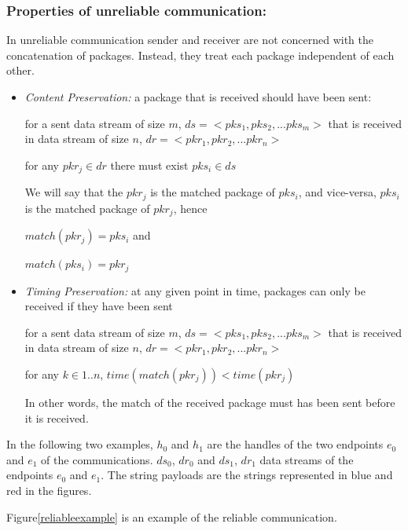 \subsubsection{Properties of unreliable communication:}\label{unreliablepro}
In unreliable communication sender and receiver are not concerned with the concatenation of packages. Instead, they treat each package independent of each other.
\begin{itemize}
 \item \textit{ Content Preservation:} a package that is received should have been sent:

for a sent data stream of size $m$, $ds= <pks_1, pks_2, ... pks_m>$ that is received in data stream of size $n$, $dr = <pkr_1, pkr_2, ... pkr_n>$

for any $pkr_j \in dr$ there must exist $pks_i \in ds$

We will say that the $pkr_j$ is the matched package of $pks_i$, and vice-versa, $pks_i$ is the matched package of $pkr_j$, hence

$match(pkr_j) = pks_i$  and

$match(pks_i) = pkr_j$

 \item \textit{Timing Preservation:}  at any given point in time, packages can only be received if they have been sent

  for a sent data stream of size $m$, $ds= <pks_1, pks_2, ... pks_m>$ that is received in data stream of size $n$, $dr = <pkr_1, pkr_2, ... pkr_n>$

  for any $k \in {1..n}$, $time(match(pkr_j)) < time(pkr_j)$

In other words, the match of the received package must has been sent before it is received.

\end{itemize}



In the following two examples, $h_0$ and $h_1$ are the handles of the two endpoints $e_0$ and $e_1$ of the communications. $ds_0$, $dr_0$ and $ds_1$, $dr_1$ data streams of the endpoints $e_0$ and $e_1$. The string payloads are the strings represented in blue and red in the figures. 

Figure\ref{reliableexample} is an example of the reliable communication. 

